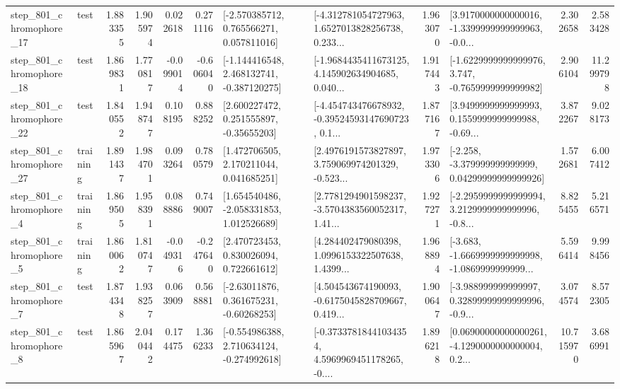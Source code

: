 \begin{tabular}{llrrrrllrlrr}
  step\_801\_chromophore\_17 &      test &      1.883355 &    1.905974 &      0.022618 &  0.271116 &    [-2.570385712, 0.765566271, 0.057811016] &  [-4.312781054727963, 1.6527013828256738, 0.233... &       1.963070 &  [3.9170000000000016, -1.3399999999999963, -0.0... &            2.302658 &          2.583428 \\
  step\_801\_chromophore\_18 &      test &      1.869831 &    1.770817 &     -0.099014 & -0.606040 &   [-1.144416548, 2.468132741, -0.387120275] &  [-1.9684435411673125, 4.145902634904685, 0.040... &       1.917443 &  [-1.6229999999999976, 3.747, -0.7659999999999982] &            2.906104 &         11.299798 \\
  step\_801\_chromophore\_22 &      test &      1.840552 &    1.948747 &      0.108195 &  0.888252 &     [2.600227472, 0.251555897, -0.35655203] &  [-4.454743476678932, -0.39524593147690723, 0.1... &       1.877167 &  [3.9499999999999993, 0.1559999999999988, -0.69... &            3.872267 &          9.028173 \\
  step\_801\_chromophore\_27 &  training &      1.891437 &    1.984701 &      0.093264 &  0.780579 &     [1.472706505, 2.170211044, 0.041685251] &  [2.4976191573827897, 3.759069974201329, -0.523... &       1.973306 &  [-2.258, -3.379999999999999, 0.04299999999999926] &            1.572681 &          6.007412 \\
   step\_801\_chromophore\_4 &  training &      1.869505 &    1.958391 &      0.088886 &  0.749007 &    [1.654540486, -2.058331853, 1.012526689] &  [2.7781294901598237, -3.5704383560052317, 1.41... &       1.927271 &  [-2.2959999999999994, 3.2129999999999996, -0.8... &            8.825455 &          5.216571 \\
   step\_801\_chromophore\_5 &  training &      1.860062 &    1.810747 &     -0.049316 & -0.247640 &     [2.470723453, 0.830026094, 0.722661612] &  [4.284402479080398, 1.0996153322507638, 1.4399... &       1.968894 &  [-3.683, -1.6669999999999998, -1.0869999999999... &            5.596414 &          9.998456 \\
   step\_801\_chromophore\_7 &      test &      1.874348 &    1.938257 &      0.063909 &  0.568881 &     [-2.63011876, 0.361675231, -0.60268253] &  [4.504543674190093, -0.6175045828709667, 0.419... &       1.900647 &  [-3.988999999999997, 0.32899999999999996, -0.9... &            3.074574 &          8.572305 \\
   step\_801\_chromophore\_8 &      test &      1.865967 &    2.040442 &      0.174475 &  1.366233 &   [-0.554986388, 2.710634124, -0.274992618] &  [-0.37337818441034354, 4.5969969451178265, -0.... &       1.896218 &  [0.06900000000000261, -4.1290000000000004, 0.2... &           10.715970 &          3.686991 \\

\end{tabular}
